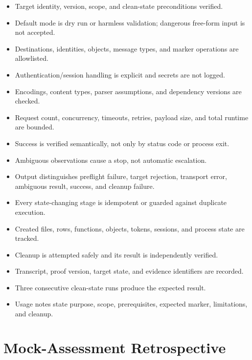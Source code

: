 \documentclass[11pt]{article}
\begin{document}
\begin{itemize}[label=$\square$]
  \item Target identity, version, scope, and clean-state preconditions verified.
  \item Default mode is dry run or harmless validation; dangerous free-form input is not accepted.
  \item Destinations, identities, objects, message types, and marker operations are allowlisted.
  \item Authentication/session handling is explicit and secrets are not logged.
  \item Encodings, content types, parser assumptions, and dependency versions are checked.
  \item Request count, concurrency, timeouts, retries, payload size, and total runtime are bounded.
  \item Success is verified semantically, not only by status code or process exit.
  \item Ambiguous observations cause a stop, not automatic escalation.
  \item Output distinguishes preflight failure, target rejection, transport error, ambiguous result, success, and cleanup failure.
  \item Every state-changing stage is idempotent or guarded against duplicate execution.
  \item Created files, rows, functions, objects, tokens, sessions, and process state are tracked.
  \item Cleanup is attempted safely and its result is independently verified.
  \item Transcript, proof version, target state, and evidence identifiers are recorded.
  \item Three consecutive clean-state runs produce the expected result.
  \item Usage notes state purpose, scope, prerequisites, expected marker, limitations, and cleanup.
\end{itemize}

\section{Mock-Assessment Retrospective}
\end{document}
